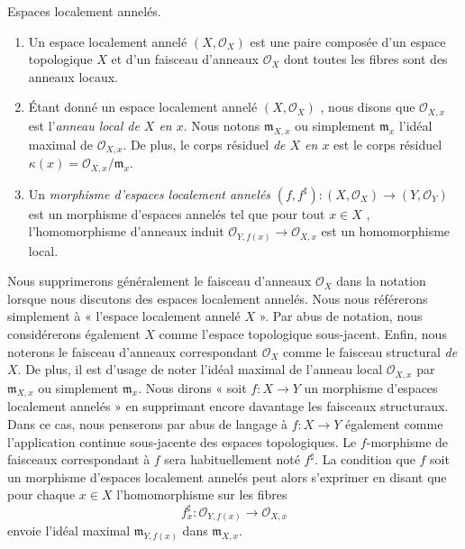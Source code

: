 \begin{definition}
\label{definition-locally-ringed-space}
Espaces localement annelés.
\begin{enumerate}
\item Un espace localement annelé  {\it   $(X, \mathcal{O}_X)$}  est
une paire composée d'un espace topologique  $X$  et d'un faisceau d'anneaux
 $\mathcal{O}_X$  dont toutes les fibres sont des anneaux locaux.
\item Étant donné un espace localement annelé  $(X, \mathcal{O}_X)$ , nous disons que  $\mathcal{O}_{X, x}$ 
est l'{\it anneau local de  $X$  en
 $x$}. Nous notons  $\mathfrak{m}_{X, x}$  ou simplement  $\mathfrak{m}_x$ 
l'idéal maximal de  $\mathcal{O}_{X, x}$. De plus, le corps résiduel
 {\it  de  $X$  en  $x$}  est le corps
résiduel  $\kappa(x) = \mathcal{O}_{X, x}/\mathfrak{m}_x$.
\item Un  {\it  morphisme d'espaces localement annelés } 
 $(f, f^\sharp) : (X, \mathcal{O}_X) \to (Y, \mathcal{O}_Y)$  est un morphisme d'espaces annelés tel que pour tout  $x \in X$ ,
l'homomorphisme d'anneaux induit  $\mathcal{O}_{Y, f(x)} \to \mathcal{O}_{X, x}$  est un homomorphisme local.
\end{enumerate}
\end{definition}

\noindent
Nous supprimerons généralement le faisceau d'anneaux  $\mathcal{O}_X$  dans la notation
lorsque nous discutons des espaces localement annelés. Nous nous référerons
simplement à « l'espace localement annelé  $X$ ». Par abus de notation,
nous considérerons également  $X$  comme l'espace topologique sous-jacent.
Enfin, nous noterons le faisceau d'anneaux correspondant  $\mathcal{O}_X$  comme le
faisceau structural  {\it  de  $X$}. De plus,
il est d’usage de noter l'idéal maximal de l'anneau local  $\mathcal{O}_{X, x}$  par
 $\mathfrak{m}_{X, x}$  ou simplement  $\mathfrak{m}_x$. Nous dirons « soit  $f : X \to Y$  un
morphisme d'espaces localement annelés » en supprimant encore davantage les
faisceaux structuraux. Dans ce cas, nous penserons par abus de langage à
 $f : X\to Y$  également comme l'application continue sous-jacente des espaces
topologiques. Le  $f$-morphisme de faisceaux correspondant à  $f$  sera
habituellement noté  $f^\sharp$. La condition que  $f$  soit un morphisme
d'espaces localement annelés peut alors s'exprimer en disant que pour chaque
 $x\in X$  l'homomorphisme sur les fibres
$$
f^\sharp_x : \mathcal{O}_{Y, f(x)} \longrightarrow \mathcal{O}_{X, x}
$$
envoie l'idéal maximal  $\mathfrak m_{Y, f(x)}$  dans  $\mathfrak m_{X, x}$.


